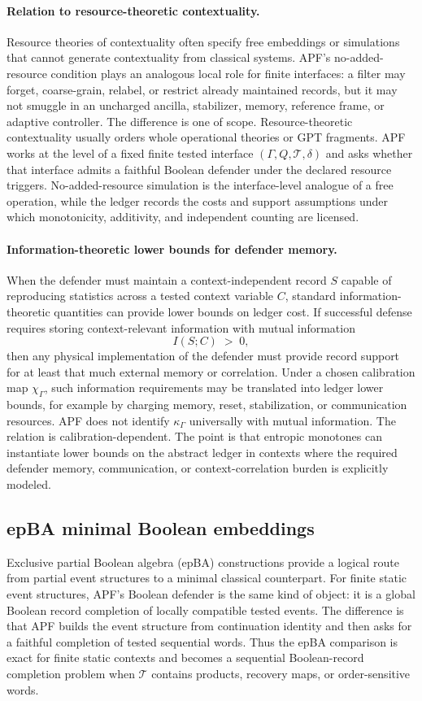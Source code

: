 \documentclass[11pt]{article}
\begin{document}
\paragraph{Relation to resource-theoretic contextuality.}
Resource theories of contextuality often specify free embeddings or
simulations that cannot generate contextuality from classical
systems.  APF's no-added-resource condition plays an analogous local
role for finite interfaces: a filter may forget, coarse-grain,
relabel, or restrict already maintained records, but it may not
smuggle in an uncharged ancilla, stabilizer, memory, reference
frame, or adaptive controller.  The difference is one of scope.
Resource-theoretic contextuality usually orders whole operational
theories or GPT fragments.  APF works at the level of a fixed
finite tested interface $(\Gamma,Q,\mathcal T,\delta)$ and asks
whether that interface admits a faithful Boolean defender under the
declared resource triggers.  No-added-resource simulation is the
interface-level analogue of a free operation, while the ledger
records the costs and support assumptions under which monotonicity,
additivity, and independent counting are licensed.

\paragraph{Information-theoretic lower bounds for defender memory.}
When the defender must maintain a context-independent record $S$
capable of reproducing statistics across a tested context variable
$C$, standard information-theoretic quantities can provide lower
bounds on ledger cost.  If successful defense requires storing
context-relevant information with mutual information
\[
    I(S;C) \;>\; 0,
\]
then any physical implementation of the defender must provide
record support for at least that much external memory or
correlation.  Under a chosen calibration map $\chi_\Gamma$, such
information requirements may be translated into ledger lower
bounds, for example by charging memory, reset, stabilization, or
communication resources.  APF does not identify $\kappa_\Gamma$
universally with mutual information.  The relation is
calibration-dependent.  The point is that entropic monotones can
instantiate lower bounds on the abstract ledger in contexts where
the required defender memory, communication, or context-correlation
burden is explicitly modeled.

\subsection*{epBA minimal Boolean embeddings}
Exclusive partial Boolean algebra (epBA) constructions provide a logical route from partial event structures to a minimal classical counterpart.  For finite static event structures, APF's Boolean defender is the same kind of object: it is a global Boolean record completion of locally compatible tested events.  The difference is that APF builds the event structure from continuation identity and then asks for a faithful completion of tested sequential words.  Thus the epBA comparison is exact for finite static contexts and becomes a sequential Boolean-record completion problem when $\mathcal T$ contains products, recovery maps, or order-sensitive words.
\end{document}
